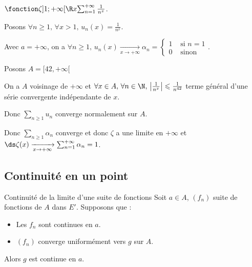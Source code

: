\begin{exemple}
    $\fonction \zeta{]1; +\infty[}{\R}{x}{\sum_{n = 1}^{+ \infty} \frac 1 {n^x}}$.

    Posons $\forall n \geqslant 1, \, \forall x > 1, \, u_n(x) = \frac 1 {n^x}$.

    Avec $a = + \infty$, on a $\forall n \geqslant 1, \, u_n(x) \xrightarrow[x \to +\infty]{} \alpha_n = \left\{\begin{array}{cc} 1 & \text{ si } n = 1 \\ 0 & \text{ sinon } \end{array} \right.$.
        
    Posons $A = [42, + \infty[$

    On a $A$ voisinage de $+ \infty$ et $\forall x \in A, \, \forall n \in \N, \, \left| \frac{1}{n^x} \right| \leqslant \frac 1 {n^{42}}$ 
    terme général d'une série convergente indépendante de $x$.

    Donc $\displaystyle \sum_{n \geqslant 1} u_n$ converge normalement sur $A$. 

    Donc $\displaystyle \sum_{n \geqslant 1} \alpha_n$ converge et donc $\zeta$ a une limite en $+ \infty$ et 
    $\ds \zeta(x) \xrightarrow[x \to +\infty]{} \sum_{n = 1}^{+\infty} \alpha_n = 1$.

\end{exemple}

\subsection{Continuité en un point}

\begin{proposition}{Continuité de la limite d'une suite de fonctions}{}
    Soit $a \in A$, $(f_n)$ suite de fonctions de $A$ dans $E'$. Supposons que : 
    \begin{itemize}
        \item Les $f_n$ sont continues en $a$.
        \item $(f_n)$ converge uniformément vers $g$ sur $A$.
    \end{itemize}
    Alors $g$ est continue en $a$.
\end{proposition}



